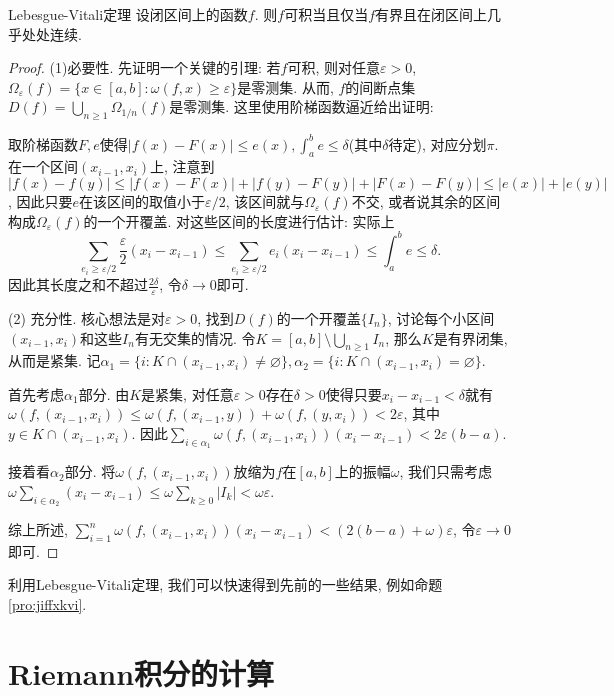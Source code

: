 \begin{theorem}{Lebesgue-Vitali定理}
	设闭区间上的函数$f$. 则$f$可积当且仅当$f$有界且在闭区间上几乎处处连续. 
\end{theorem}
\begin{proof}
	(1)必要性. 先证明一个关键的引理: 若$f$可积, 则对任意$\varepsilon >0$, $\Omega _{\varepsilon} (f) = \{ x\in [a,b]:\omega (f,x)\geq \varepsilon \}$是零测集. 从而, $f$的间断点集$D(f)=\bigcup_{n\geq 1}\Omega _{1/n}(f)$是零测集. 这里使用阶梯函数逼近给出证明: 
	
	取阶梯函数$F,e$使得$|f(x)-F(x)| \leq e(x), \int_a^b e \leq \delta$(其中$\delta$待定), 对应分划$\pi$. 在一个区间$(x_{i-1},x_i)$上, 注意到$|f(x)-f(y)| \leq |f(x)-F(x)| + |f(y)-F(y)| + |F(x)-F(y)| \leq |e(x)|+|e(y)|$, 因此只要$e$在该区间的取值小于$\varepsilon /2$, 该区间就与$\Omega _{\varepsilon}(f)$不交, 或者说其余的区间构成$\Omega _{\varepsilon}(f)$的一个开覆盖. 对这些区间的长度进行估计: 实际上$$\sum_{e_i \geq \varepsilon /2} \frac{\varepsilon}{2} (x_{i}-x_{i-1}) \leq \sum_{e_i \geq \varepsilon /2} e_i (x_{i}-x_{i-1}) \leq \int_a^b e\leq \delta .$$
	因此其长度之和不超过$\frac{2\delta}{\varepsilon}$, 令$\delta \to 0$即可. 
	
	(2) 充分性. 核心想法是对$\varepsilon >0$, 找到$D(f)$的一个开覆盖$\{ I_n \}$, 讨论每个小区间$(x_{i-1},x_i)$和这些$I_n$有无交集的情况. 令$K=[a,b] \setminus \bigcup_{n\geq 1}I_n$, 那么$K$是有界闭集, 从而是紧集. 记$\alpha _1 =\{ i:K \cap (x_{i-1},x_i) \neq \varnothing \}, \alpha _2 =\{ i:K \cap (x_{i-1},x_i) = \varnothing \}$. 
	
	首先考虑$\alpha _1$部分. 由$K$是紧集, 对任意$\varepsilon >0$存在$\delta >0$使得只要$x_i-x_{i-1}<\delta$就有$\omega (f,(x_{i-1},x_i)) \leq \omega (f,(x_{i-1},y)) + \omega (f,(y,x_i)) <2\varepsilon$, 其中$y \in K\cap (x_{i-1},x_i)$. 因此$\sum_{i \in \alpha _1} \omega (f,(x_{i-1},x_i))(x_i-x_{i-1}) < 2\varepsilon (b-a)$. 
	
	接着看$\alpha _2$部分. 将$\omega (f,(x_{i-1},x_i))$放缩为$f$在$[a,b]$上的振幅$\omega$, 我们只需考虑$\omega\sum_{i \in \alpha _2} (x_i-x_{i-1}) \leq \omega \sum_{k \geq 0} |I_k| < \omega \varepsilon$. 
	
	综上所述, $\sum_{i=1}^{n} \omega (f,(x_{i-1},x_i))(x_i-x_{i-1}) < (2(b-a)+\omega)\varepsilon$, 令$\varepsilon \to 0$即可. 
\end{proof}

利用Lebesgue-Vitali定理, 我们可以快速得到先前的一些结果, 例如命题\ref{pro:jiffxkvi}. 

\newpage
\section{Riemann积分的计算}


